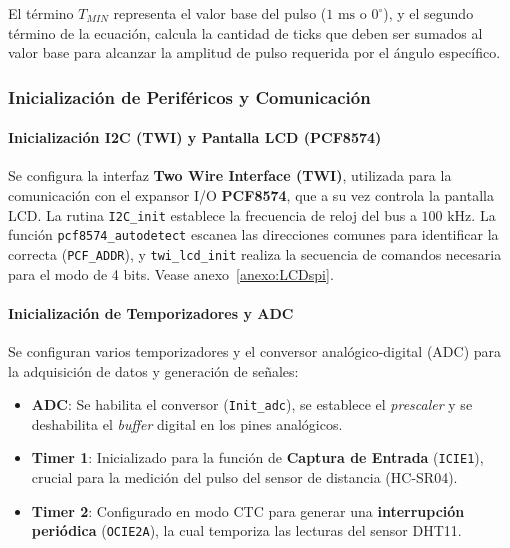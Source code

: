 \vspace{1em}

El término $T_{MIN}$ representa el valor base del pulso ($1 \text{ ms}$ o $0^\circ$), y el segundo término de la ecuación, calcula la cantidad de ticks que deben ser sumados al valor base para alcanzar la amplitud de pulso requerida por el ángulo específico.


\vspace{1em}

\subsubsection{Inicialización de Periféricos y Comunicación}


\paragraph{Inicialización I2C (TWI) y Pantalla LCD (PCF8574)}
Se configura la interfaz \textbf{Two Wire Interface (TWI)}, utilizada para la comunicación con el expansor I/O \textbf{PCF8574}, que a su vez controla la pantalla LCD. La rutina \texttt{I2C\_init} establece la frecuencia de reloj del bus a $100 \text{ kHz}$. La función \texttt{pcf8574\_autodetect} escanea las direcciones comunes para identificar la correcta (\texttt{PCF\_ADDR}), y \texttt{twi\_lcd\_init} realiza la secuencia de comandos necesaria para el modo de 4 bits. Vease anexo~\ref{anexo:LCDspi}.

\vspace{1em}
\paragraph{Inicialización de Temporizadores y ADC}
Se configuran varios temporizadores y el conversor analógico-digital (ADC) para la adquisición de datos y generación de señales:
\begin{itemize}
    \item \textbf{ADC}: Se habilita el conversor (\texttt{Init\_adc}), se establece el \textit{prescaler} y se deshabilita el \textit{buffer} digital en los pines analógicos.
    \item \textbf{Timer 1}: Inicializado para la función de \textbf{Captura de Entrada} (\texttt{ICIE1}), crucial para la medición del pulso del sensor de distancia (HC-SR04).
    \item \textbf{Timer 2}: Configurado en modo CTC para generar una \textbf{interrupción periódica} (\texttt{OCIE2A}), la cual temporiza las lecturas del sensor DHT11.
\end{itemize}


